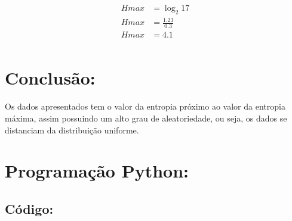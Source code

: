 \documentclass{article}
\begin{document}
\begin{align*}
    Hmax &= \log_2 17 \\
    Hmax &= \frac{1.23}{0.3} \\
    Hmax &= 4.1 \\
\end{align*}

\section{Conclusão:}
Os dados apresentados tem o valor da entropia próximo ao valor da entropia máxima, assim possuindo um alto grau de aleatoriedade, ou seja, os dados se distanciam da distribuição uniforme.\newline

\section{Programação Python:}
\subsection{Código:}
\end{document}
